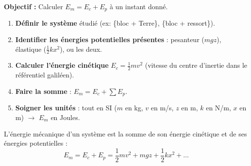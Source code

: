 \documentclass[11pt]{article}
\begin{document}
\begin{methode}
    \textbf{Objectif :} Calculer $E_m = E_c + E_p$ à un instant donné.
    \begin{enumerate}
        \item \textbf{Définir le système} étudié (ex: \{bloc + Terre\}, \{bloc + ressort\}).
        \item \textbf{Identifier les énergies potentielles présentes} : pesanteur ($m g z$), élastique ($\frac{1}{2}k x^2$), ou les deux.
        \item \textbf{Calculer l'énergie cinétique} $E_c = \frac{1}{2} m v^2$ (vitesse du centre d'inertie dans le référentiel galiléen).
        \item \textbf{Faire la somme} : $E_m = E_c + \sum E_p$.
        \item \textbf{Soigner les unités} : tout en SI ($m$ en kg, $v$ en m/s, $z$ en m, $k$ en N/m, $x$ en m) $\rightarrow$ $E_m$ en Joules.
    \end{enumerate}
    \begin{aretenir}[Définition]
        L'énergie mécanique d'un système est la somme de son énergie cinétique et de ses énergies potentielles :
        \[ E_m = E_c + E_p = \frac{1}{2} m v^2 + m g z + \frac{1}{2} k x^2 + \dots \]
    \end{aretenir}
\end{methode}
\end{document}
